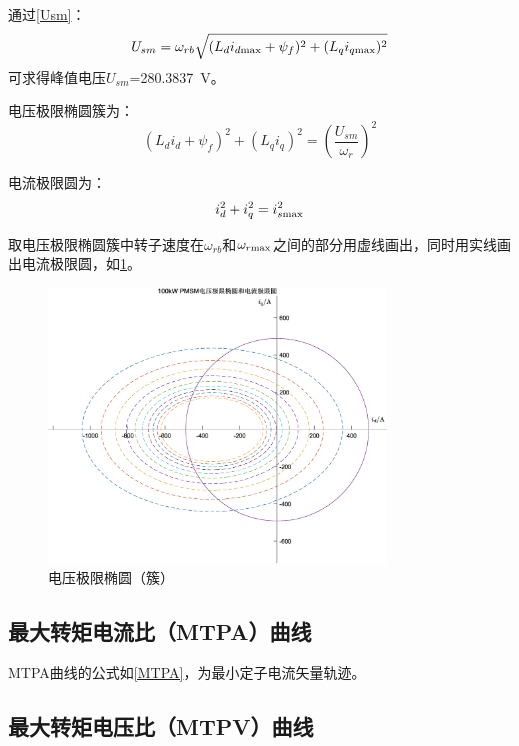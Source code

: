 \documentclass[UTF8]{ctexart}
\numberwithin{figure}{section}
\numberwithin{table}{section}
\begin{document}
通过\cref{Usm}\cite{b}：
\begin{equation}
	U_{sm}=\omega_{rb}\sqrt{(L_di_{d\rm max}+\psi_f)^2+(L_qi_{q\rm max})^2}\label{Usm}
\end{equation}
可求得峰值电压$U_{sm}$=\SI[round-mode=places,round-precision=2]{280.3837}{\volt}。

电压极限椭圆簇\cite{b}为：
\begin{equation}
	(L_di_d+\psi_f)^2+(L_qi_q)^2=\left(\frac{U_{sm}}{\omega_r}\right)^2\label{voltLim}
\end{equation}

电流极限圆\cite{b}为：
\begin{equation}
	i_d^2+i_q^2=i_{s\rm max}^2\label{curLim}
\end{equation}

取电压极限椭圆簇中转子速度在$\omega_{rb}$和$\omega_{r\rm max}$之间的部分用虚线画出，同时用实线画出电流极限圆，如\cref{voltLimFig}。

\begin{figure}[htbp]
	\centering
	\includegraphics[width=0.8\textwidth]{3}
	\caption{电压极限椭圆（簇）}
	\label{voltLimFig}
\end{figure}

\subsection{最大转矩电流比（MTPA）曲线}
\label{subsection:2.4}

MTPA曲线的公式如\cref{MTPA}，为最小定子电流矢量轨迹\cite{b}。

\subsection{最大转矩电压比（MTPV）曲线}
\label{subsection:2.5}
\end{document}
